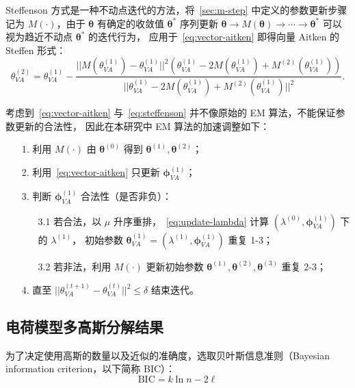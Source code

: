 Steffenson 方式是一种不动点迭代的方法，将~\ref{sec:m-step} 中定义的参数更新步骤记为 $M(\cdot)$，由于 $\boldsymbol{\theta}$ 有确定的收敛值 $\boldsymbol{\theta}^*$
序列更新 $\boldsymbol{\theta}\rightarrow M(\boldsymbol{\theta})\rightarrow\cdots\rightarrow\boldsymbol{\theta}^{*}$ 可以视为趋近不动点 $\boldsymbol{\theta}^*$ 的迭代行为，
应用于~\eqref{eq:vector-aitken} 即得向量 Aitken 的 Steffen 形式：
\begin{equation}
    \label{eq:steffenson}
    \theta_{VA}^{(2)}=\theta_{VA}^{(1)}-\frac{||M(\theta_{VA}^{(1)})-
    \theta_{VA}^{(1)}||^2(\theta_{VA}^{(1)}-2M(\theta_{VA}^{(1)})+M^{(2)}
    (\theta_{VA}^{(1)}))}{||\theta_{VA}^{(1)}-2M(\theta_{VA}^{(1)})+M^{(2)}(\theta_{VA}^{(1)})||^2}.
\end{equation}

考虑到~\eqref{eq:vector-aitken} 与~\eqref{eq:steffenson} 并不像原始的 EM 算法，不能保证参数更新的合法性，
因此在本研究中 EM 算法的加速调整如下：
\begin{enumerate}
    \item[1.] 利用 $M(\cdot)$ 由 $\boldsymbol{\theta}^{(0)}$ 得到 $\boldsymbol{\theta}^{(1)}, \boldsymbol{\theta}^{(2)}$；
    \item[2.] 利用~\eqref{eq:vector-aitken} 只更新 $\boldsymbol{\phi}_{VA}^{(1)}$；
    \item[3.] 判断 $\boldsymbol{\phi}_{VA}^{(1)}$ 合法性（是否非负）：
    \begin{enumerate}
        \item[3.1 ] 若合法，以 $\mu$ 升序重排，~\eqref{eq:update-lambda} 计算 $(\lambda^{(0)}, \boldsymbol{\phi}_{VA}^{(1)})$ 下的 $\lambda^{(1)}$，
        初始参数 $\boldsymbol{\theta}_{VA}^{(1)}=(\lambda^{(1)}, \boldsymbol{\phi}_{VA}^{(1)})$ 重复 1-3；
        \item[3.2 ] 若非法，利用 $M(\cdot)$ 更新初始参数 $\boldsymbol{\theta}^{(1)},\boldsymbol{\theta}^{(2)}, \boldsymbol{\theta}^{(3)}$ 重复 2-3；
    \end{enumerate}
    \item[4.] 直至 $||\theta_{VA}^{(t+1)}-\theta_{VA}^{(t)}||^2\leq\delta$ 结束迭代。
\end{enumerate}

\subsection{电荷模型多高斯分解结果}

为了决定使用高斯的数量以及近似的准确度，选取贝叶斯信息准则（Bayesian information criterion，以下简称 BIC）：
\begin{equation}
    \label{eq:bic}
    \text{BIC}=k\ln{n}-2\ell
\end{equation}

